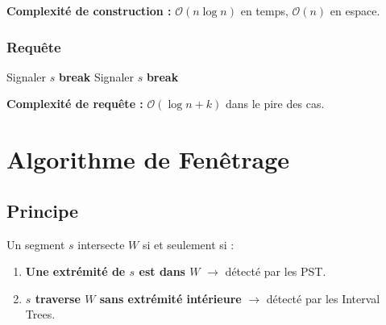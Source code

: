 \documentclass[11pt,a4paper]{article}
\begin{document}
\textbf{Complexité de construction :} $\mathcal{O}(n \log n)$ en temps, $\mathcal{O}(n)$ en espace.

\subsubsection{Requête}

\begin{algorithm}[H]
\caption{Requête de croisement sur l'Interval Tree}
\begin{algorithmic}[1]
     \Return \EndIf
                    \State Signaler $s$
                \EndIf
            \Else
                \State \textbf{break} 
            \EndIf
        \EndFor
        \State {}
    \Else
                    \State Signaler $s$
                \EndIf
            \Else
                \State \textbf{break}
            \EndIf
        \EndFor
        \State {}
    \EndIf
\EndProcedure
\end{algorithmic}
\end{algorithm}

\textbf{Complexité de requête :} $\mathcal{O}(\log n + k)$ dans le pire des cas.

\section{Algorithme de Fenêtrage}

\subsection{Principe}

Un segment $s$ intersecte $W$ si et seulement si :
\begin{enumerate}
    \item \textbf{Une extrémité de $s$ est dans $W$} $\rightarrow$ détecté par les PST.
    \item \textbf{$s$ traverse $W$ sans extrémité intérieure} $\rightarrow$ détecté par les Interval Trees.
\end{enumerate}
\end{document}
